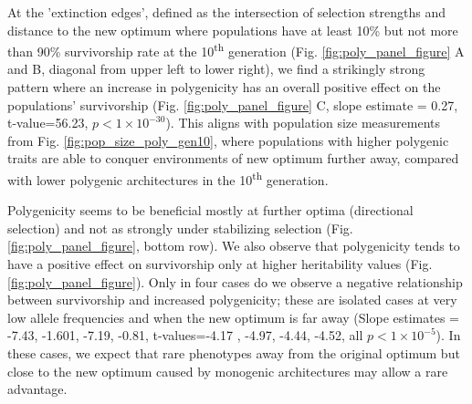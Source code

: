 \documentclass{article}
\begin{document}
At the 'extinction edges', defined as the intersection of selection strengths and distance to the new optimum where populations have at least 10\% but not more than 90\% survivorship rate at the 10\textsuperscript{th} generation (Fig. \ref{fig:poly_panel_figure} A and B, diagonal from upper left to lower right), we find a strikingly strong pattern where an increase in polygenicity has an overall positive effect on the populations' survivorship (Fig. \ref{fig:poly_panel_figure}  C, slope estimate = 0.27, t-value=56.23,  $p<1 \times 10^{-30}$). This aligns with population size measurements from Fig. \ref{fig:pop_size_poly_gen10}, where populations with higher polygenic traits are able to conquer environments of new optimum further away, compared with lower polygenic architectures in the 10\textsuperscript{th} generation.

Polygenicity seems to be beneficial mostly at further optima (directional selection) and not as strongly under stabilizing selection (Fig. \ref{fig:poly_panel_figure}, bottom row). We also observe that polygenicity tends to have a positive effect on survivorship only at higher heritability values (Fig. \ref{fig:poly_panel_figure}). Only in four cases do we observe a negative relationship between survivorship and increased polygenicity; these are isolated cases at very low allele frequencies and when the new optimum is far away (Slope estimates = -7.43, -1.601, -7.19, -0.81, t-values=-4.17 , -4.97, -4.44, -4.52,  all $p<1 \times 10^{-5}$). In these cases, we expect that rare phenotypes away from the original optimum but close to the new optimum caused by monogenic architectures may allow a rare  advantage.
\end{document}
